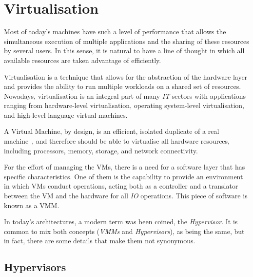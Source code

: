 \section{Virtualisation}
\label{sec:res_virtualisation}

Most of today's machines have such a level of performance that allows the simultaneous execution of multiple applications and the sharing of these resources by several users. In this sense, it is natural to have a line of thought in which all available resources are taken advantage of efficiently. %

Virtualisation is a technique that allows for the abstraction of the hardware layer and provides the ability to run multiple workloads on a shared set of resources. Nowadays, virtualisation is an integral part of many \textit{IT} sectors with applications ranging from hardware-level virtualisation, operating system-level virtualisation, and high-level language virtual machines.
\nocite{VMware_VM2006}

A Virtual Machine, by design, is an efficient, isolated duplicate of a real machine~\cite{Popek1974}, and therefore should be able to virtualise all hardware resources, including processors, memory, storage, and network connectivity.

For the effort of managing the VMs, there is a need for a software layer that has specific characteristics. One of them is the capability to provide an environment in which VMs conduct operations, acting both as a controller and a translator between the VM and the hardware for all \textit{IO} operations. This piece of software is known as a \gls{VMM}.

In today's architectures, a modern term was been coined, the \textit{Hypervisor}. It is common to mix both concepts (\textit{VMMs} and \textit{Hypervisors}), as being the same, but in fact, there are some details that make them not synonymous.~\cite{Agesen2010}

\subsection{Hypervisors} %
\label{sub:res_hypervisors}

